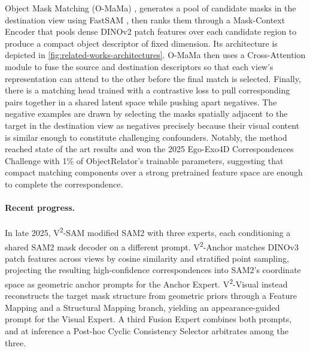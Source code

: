 Object Mask Matching (O-MaMa) \cite{o-mama}, generates a pool of candidate masks in the destination view using FastSAM \cite{zhao2023fastsegment}, then ranks them through a Mask-Context Encoder that pools dense DINOv2 \cite{oquab2023dinov2} patch features over each candidate region to produce a compact object descriptor of fixed dimension. Its architecture is depicted in \cref{fig:related-works-architectures}. O-MaMa then uses a Cross-Attention module to fuse the source and destination descriptors so that each view's representation can attend to the other before the final match is selected. Finally, there is a matching head trained with a contrastive loss to pull corresponding pairs together in a shared latent space while pushing apart negatives. The negative examples are drawn by selecting the masks spatially adjacent to the target in the destination view as negatives precisely because their visual content is similar enough to constitute challenging confounders. Notably, the method reached state of the art results and won the 2025 Ego-Exo4D Correspondences Challenge with 1\% of ObjectRelator's trainable parameters, suggesting that compact matching components over a strong pretrained feature space are enough to complete the correspondence. 

\paragraph{Recent progress.} In late 2025, V\textsuperscript{2}-SAM modified SAM2 with three experts, each conditioning a shared SAM2 mask decoder on a different prompt. V\textsuperscript{2}-Anchor matches DINOv3 patch features across views by cosine similarity and stratified point sampling, projecting the resulting high-confidence correspondences into SAM2's coordinate space as geometric anchor prompts for the Anchor Expert. V\textsuperscript{2}-Visual instead reconstructs the target mask structure from geometric priors through a Feature Mapping and a Structural Mapping branch, yielding an appearance-guided prompt for the Visual Expert. A third Fusion Expert combines both prompts, and at inference a Post-hoc Cyclic Consistency Selector arbitrates among the three.

